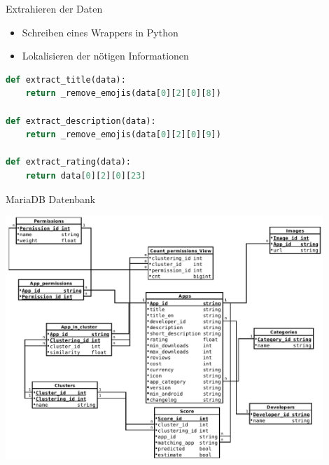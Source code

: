 \documentclass[compress,t]{beamer}
\begin{document}
\begin{frame}[fragile]{Extrahieren der Daten}
    \begin{itemize}
        \item Schreiben eines Wrappers in Python
        \item Lokalisieren der nötigen Informationen
    \end{itemize}

    \begin{lstlisting}[language=Python]
def extract_title(data):
    return _remove_emojis(data[0][2][0][8])

def extract_description(data):
    return _remove_emojis(data[0][2][0][9])

def extract_rating(data):
    return data[0][2][0][23]
    \end{lstlisting}

\end{frame}


\begin{frame}{MariaDB Datenbank}

    \begin{center}
        \includegraphics[width=0.9\textwidth]{img/Scheme_extended_3.png}
    \end{center}

\end{frame}

\end{document}

